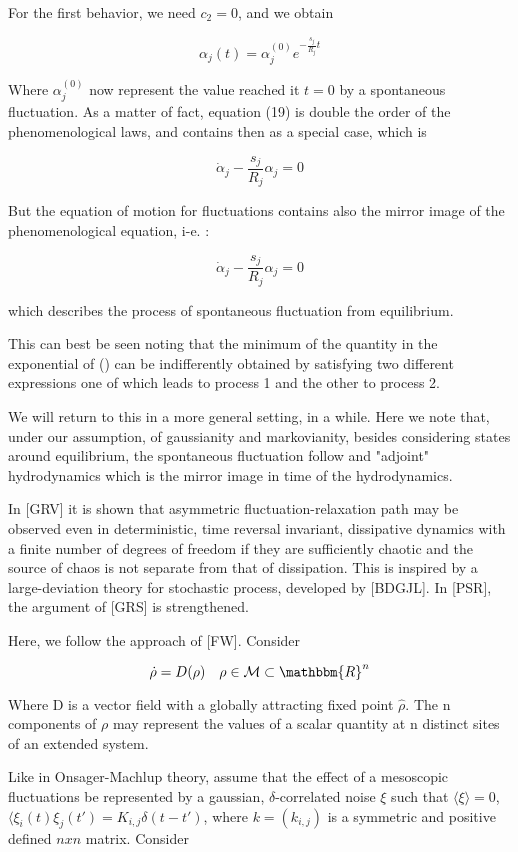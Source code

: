 \documentclass{article}
\begin{document}
For the first behavior, we need $c_2=0$, and we obtain

$$ \alpha_j(t)=\alpha^{(0)}_j e^{-\frac{s_j}{R_j} t} $$

Where $\alpha^{(0)}_j$ now represent the value reached it $t=0$ by a spontaneous fluctuation. As a matter of fact, equation (19)  is double the order of the phenomenological laws, and contains then as a special case, which is

$$ \dot{\alpha}_j -\frac{s_j}{R_j} \alpha_j = 0 $$

But the equation of motion for fluctuations contains also the mirror image of the phenomenological equation, i-e. :

$$ \dot{\alpha}_j -\frac{s_j}{R_j} \alpha_j = 0 $$

which describes the process of spontaneous fluctuation from equilibrium. 

This can best be seen noting that the minimum of the quantity in the exponential of () can be indifferently obtained by satisfying two different expressions one of which leads to process 1 and the other to process 2.

We will return to this in a more general setting, in a while. Here we note that, under our assumption, of gaussianity and markovianity, besides considering states around equilibrium, the spontaneous fluctuation follow and "adjoint" hydrodynamics which is the mirror image in time of the hydrodynamics.

\newpage

In [GRV] it is shown that asymmetric fluctuation-relaxation path may be observed even in deterministic, time reversal invariant, dissipative dynamics with a finite number of degrees of freedom if they are sufficiently chaotic and the source of chaos is not separate from that of dissipation. This is inspired by a large-deviation theory for stochastic process, developed by [BDGJL]. In [PSR], the argument of [GRS] is strengthened.

Here, we follow the approach of [FW]. Consider 

$$\dot{\rho} = D(\rho) \quad \rho \in \mathcal{M} \subset \mathbbm{R}^n $$

Where D is a vector field with a globally attracting fixed point $\hat{\rho}$. The n components of $\rho$ may represent the values of a scalar quantity at n distinct sites of an extended system. 

Like in Onsager-Machlup theory, assume that the effect of a mesoscopic fluctuations be represented by a gaussian, $\delta$-correlated noise $\xi$ such that $\langle \xi \rangle = 0$, $\langle \xi_i(t) \xi_j(t') = K_{i,j} \delta(t-t')$, where $k=(k_{i,j})$ is a symmetric and positive defined $n x n$ matrix. Consider
\end{document}
